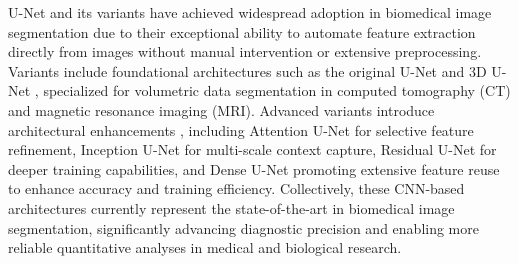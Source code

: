 \documentclass[./dissertation.tex]{subfiles}
\begin{document}
U-Net and its variants have achieved widespread adoption in biomedical image segmentation due to their exceptional ability to automate feature extraction directly from images without manual intervention or extensive preprocessing. Variants include foundational architectures such as the original U-Net and 3D U-Net \cite{cciccek20163d}, specialized for volumetric data segmentation in computed tomography (CT) and magnetic resonance imaging (MRI). Advanced variants introduce architectural enhancements \cite{cao2022swin}, including Attention U-Net for selective feature refinement, Inception U-Net for multi-scale context capture, Residual U-Net for deeper training capabilities, and Dense U-Net promoting extensive feature reuse to enhance accuracy and training efficiency. Collectively, these CNN-based architectures currently represent the state-of-the-art in biomedical image segmentation, significantly advancing diagnostic precision and enabling more reliable quantitative analyses in medical and biological research.
\end{document}
